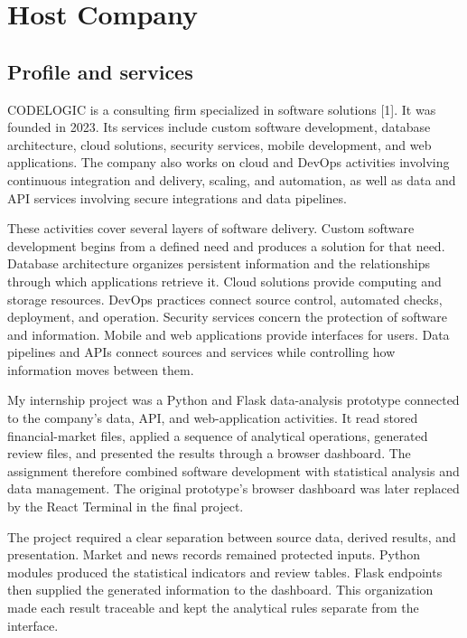 \chapter{Host Company}

\section{Profile and services}

CODELOGIC is a consulting firm specialized in software solutions [1]. It was
founded in 2023. Its services include custom software development, database
architecture, cloud solutions, security services, mobile development, and web
applications. The company also works on cloud and DevOps activities involving
continuous integration and delivery, scaling, and automation, as well as data
and API services involving secure integrations and data pipelines.

These activities cover several layers of software delivery. Custom software
development begins from a defined need and produces a solution for that need.
Database architecture organizes persistent information and the relationships
through which applications retrieve it. Cloud solutions provide computing and
storage resources. DevOps practices connect source control, automated checks,
deployment, and operation. Security services concern the protection of
software and information. Mobile and web applications provide interfaces for
users. Data pipelines and APIs connect sources and services while controlling
how information moves between them.

My internship project was a Python and Flask data-analysis prototype connected
to the company's data, API, and web-application activities. It read stored
financial-market files, applied a sequence of analytical operations, generated
review files, and presented the results through a browser dashboard. The
assignment therefore combined software development with statistical analysis
and data management. The original prototype's browser dashboard was later
replaced by the React Terminal in the final project.

The project required a clear separation between source data, derived results,
and presentation. Market and news records remained protected inputs. Python
modules produced the statistical indicators and review tables. Flask endpoints
then supplied the generated information to the dashboard. This organization
made each result traceable and kept the analytical rules separate from the
interface.

